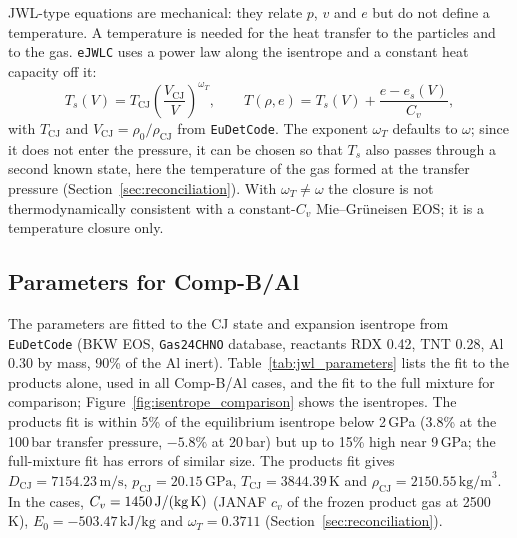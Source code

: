 \documentclass{article}
\begin{document}
JWL-type equations are mechanical: they relate $p$, $v$ and $e$ but do not define a temperature. A temperature is needed for the heat transfer to the particles and to the gas. \texttt{eJWLC} uses a power law along the isentrope and a constant heat capacity off it:
\begin{equation}
    T_s(V) = T_\text{CJ}\left(\frac{V_\text{CJ}}{V}\right)^{\omega_T}, \qquad T(\rho, e) = T_s(V) + \frac{e - e_s(V)}{C_v},
\end{equation}
with $T_\text{CJ}$ and $V_\text{CJ} = \rho_0/\rho_\text{CJ}$ from \texttt{EuDetCode}. The exponent $\omega_T$ defaults to $\omega$; since it does not enter the pressure, it can be chosen so that $T_s$ also passes through a second known state, here the temperature of the gas formed at the transfer pressure (Section~\ref{sec:reconciliation}). With $\omega_T \neq \omega$ the closure is not thermodynamically consistent with a constant-$C_v$ Mie--Gr\"uneisen EOS; it is a temperature closure only.

\subsection{Parameters for Comp-B/Al}
\label{sec:fit}

The parameters are fitted to the CJ state and expansion isentrope from \texttt{EuDetCode} (BKW EOS, \texttt{Gas24CHNO} database, reactants RDX 0.42, TNT 0.28, Al 0.30 by mass, 90\% of the Al inert). Table~\ref{tab:jwl_parameters} lists the fit to the products alone, used in all Comp-B/Al cases, and the fit to the full mixture for comparison; Figure~\ref{fig:isentrope_comparison} shows the isentropes. The products fit is within 5\% of the equilibrium isentrope below 2\,GPa (3.8\% at the 100\,bar transfer pressure, $-5.8\%$ at 20\,bar) but up to 15\% high near 9\,GPa; the full-mixture fit has errors of similar size. The products fit gives $D_\text{CJ} = 7154.23\,\text{m/s}$, $p_\text{CJ} = 20.15\,\text{GPa}$, $T_\text{CJ} = 3844.39\,\text{K}$ and $\rho_\text{CJ} = 2150.55\,\text{kg/m}^3$. In the cases, $C_v = 1450\,\text{J/(kg\,K)}$ (JANAF $c_v$ of the frozen product gas at 2500\,K), $E_0 = -503.47\,\text{kJ/kg}$ and $\omega_T = 0.3711$ (Section~\ref{sec:reconciliation}).
\end{document}
